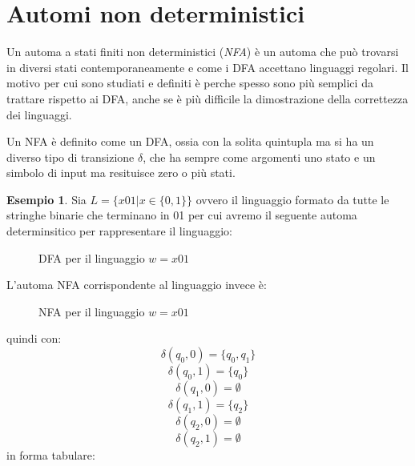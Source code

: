 \documentclass[a4paper]{book}
\theoremstyle{definition}%
\newtheorem*{esempio}{Esempio}
\begin{document}
\section{Automi non deterministici}
Un automa a stati finiti non deterministici (\emph{NFA}) è un automa che può trovarsi in diversi stati contemporaneamente
e come i DFA accettano linguaggi regolari.\newline
Il motivo per cui sono studiati e definiti è perche spesso sono più semplici da trattare rispetto ai DFA,
anche se è più difficile la dimostrazione della correttezza dei linguaggi.

Un NFA è definito come un DFA, ossia con la solita quintupla ma si ha un diverso tipo di transizione $\delta$,
che ha sempre come argomenti uno stato e un simbolo di input ma resituisce zero o più stati.
\begin{esempio}
Sia $L = \{x01| x\in\{0,1\}\}$ ovvero il linguaggio formato da tutte le stringhe binarie che terminano in 01
per cui avremo il seguente automa determinsitico per rappresentare il linguaggio:
\begin{figure}
\centering
\caption{DFA per il linguaggio $w = x01$}
\end{figure}
L'automa NFA corrispondente al linguaggio invece è:
\begin{figure}
\centering
\caption{NFA per il linguaggio $w = x01$}
\end{figure}
quindi con:
\[ \delta(q_0,0)=\{q_0,q_1\} \]
\[ \delta(q_0,1)=\{q_0\} \]
\[ \delta(q_1,0)=\emptyset \]
\[ \delta(q_1,1)=\{q_2\} \]
\[ \delta(q_2,0)=\emptyset \]
\[ \delta(q_2,1)=\emptyset \]
in forma tabulare:

\end{esempio}
\end{document}
